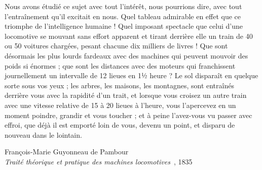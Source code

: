 \thispagestyle{empty}

{\large {\color{gray}\scalebox{3}{«}} Nous avons étudié ce sujet avec tout l’intérêt, nous pourrions dire, avec tout l’entraînement qu’il excitait en nous. Quel tableau admirable en effet que ce triomphe de l’intelligence humaine ! Quel imposant spectacle que celui d’une locomotive se mouvant sans effort apparent et tirant derrière elle un train de 40 ou 50 voitures chargées, pesant chacune dix milliers de livres ! Que sont désormais les plus lourds fardeaux avec des machines qui peuvent mouvoir des poids si énormes ; que sont les distances avec des moteurs qui franchissent journellement un intervalle de 12 lieues en  1½ heure ? Le sol disparaît en quelque sorte sous vos yeux ; les arbres, les maisons, les montagnes, sont entraînés derrière vous avec la rapidité d’un trait, et lorsque vous croisez un autre train avec une vitesse relative de 15 à 20 lieues à l’heure, vous l’apercevez en un moment poindre, grandir et vous toucher ; et à peine l’avez-vous vu passer avec effroi, que déjà il est emporté loin de vous, devenu un point, et disparu de nouveau dans le lointain. \raisebox{-1.6ex}{{\color{gray}\scalebox{3}{»}}}}

\begin{flushright}
François-Marie Guyonneau de Pambour\\
\textit{Traité théorique et pratique des machines locomotives}~\cite{pambour1835}, 1835
\end{flushright}
\restoregeometry

